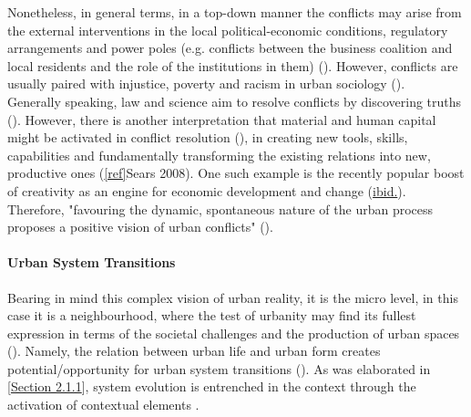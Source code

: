 \documentclass[11pt]{report}
\begin{document}
{{{{Nonetheless, in general terms, in a top-down manner the conflicts may arise from the external interventions in the local political-economic conditions, regulatory arrangements and power poles (e.g. conflicts between the business coalition and local residents and the role of the institutions in them) (\cite{Brenner and Theodore}).
However, conflicts are usually paired with injustice, poverty and racism in urban sociology (\cite{Hubbard 2004}).
\\

Generally speaking, law and science aim to resolve conflicts by discovering truths (\cite{Brenner and Theodore}).
However, there is another interpretation that material and human capital might be activated in conflict resolution (\href{Coleman}{\citealt{coleman_social_1988}}), in creating new tools, skills, capabilities and fundamentally transforming the existing relations into new, productive ones (\ref{ref}{Sears 2008}).
One such example is the recently popular boost of creativity as an engine for economic development and change (\href{Sears}{ibid.}).
Therefore, "favouring the dynamic, spontaneous nature of the urban process proposes a positive vision of urban conflicts" 
(\href{Sevilla-Buitrago}{\citealt{evilla-buitrago_debating_2013}}).

\paragraph{Urban System Transitions}

Bearing in mind this complex vision of urban reality, it is the micro level, in this case it is a neighbourhood, where the test of urbanity may find its fullest expression in terms of the societal challenges and the production of urban spaces (\href{Blotevogel}{\citealt{blotevogel_new_2008}}).
Namely, the relation between urban life and urban form creates potential/opportunity for urban system transitions (\href{Marcus}{\citealt{marcus_spatial_2007}}).
As was elaborated in [\href{Section 2.1.1}{Section 2.1.1}], system evolution is entrenched in the context through the activation of contextual elements .
\\

}}}}
\end{document}
